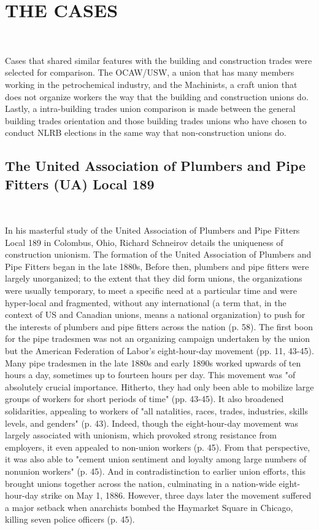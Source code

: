 \documentclass[12pt]{article}
\begin{document}
\section{THE CASES} \

Cases that shared similar features with the building and construction trades were selected for comparison. The OCAW/USW, a union that has many members working in the petrochemical industry, and the Machinists, a craft union that does not organize workers the way that the building and construction unions do. Lastly, a intra-building trades union comparison is made between the general building trades orientation and those building trades unions who have chosen to conduct NLRB elections in the same way that non-construction unions do.

\subsection{The United Association of Plumbers and Pipe Fitters (UA) Local 189} \

In his masterful study of the United Association of Plumbers and Pipe Fitters Local 189 in Colombus, Ohio, Richard Schneirov details the uniqueness of construction unionism. The formation of the United Association of Plumbers and Pipe Fitters began in the late 1880s, Before then, plumbers and pipe fitters were largely unorganized; to the extent that they did form unions, the organizations were usually temporary, to meet a specific need at a particular time and were hyper-local and fragmented, without any international (a term that, in the context of US and Canadian unions, means a national organization) to push for the interests of plumbers and pipe fitters across the nation (p. 58). The first boon for the pipe tradesmen was not an organizing campaign undertaken by the union but the American Federation of Labor’s eight-hour-day movement (pp. 11, 43-45). Many pipe tradesmen in the late 1880s and early 1890s worked upwards of ten hours a day, sometimes up to fourteen hours per day. This movement was "of absolutely crucial importance. Hitherto, they had only been able to mobilize large groups of workers for short periods of time" (pp. 43-45). It also broadened solidarities, appealing to workers of "all natalities, races, trades, industries, skills levels, and genders" (p. 43). Indeed, though the eight-hour-day movement was largely associated with unionism, which provoked strong resistance from employers, it even appealed to non-union workers (p. 45). From that perspective, it was also able to "cement union sentiment and loyalty among large numbers of nonunion workers" (p. 45). And in contradistinction to earlier union efforts, this brought unions together across the nation, culminating in a nation-wide eight-hour-day strike on May 1, 1886. However, three days later the movement suffered a major setback when anarchists bombed the Haymarket Square in Chicago, killing seven police officers (p. 45).
\end{document}
